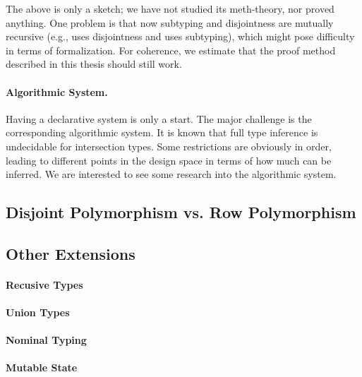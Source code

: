 The above is only a sketch; we have not studied its meth-theory, nor proved
anything. One problem is that now subtyping and disjointness are mutually
recursive (e.g.,  uses disjointness and  uses
subtyping), which might pose difficulty in terms of formalization. For
coherence, we estimate that the proof method described in this thesis should
still work.

\paragraph{Algorithmic System.}

Having a declarative system is only a start. The major challenge is the
corresponding algorithmic system. It is known that full type inference is
undecidable for intersection types. Some restrictions are obviously in order,
leading to different points in the design space in terms of how much can be
inferred. We are interested to see some research into the algorithmic system.


\subsection{Disjoint Polymorphism vs. Row Polymorphism}



\subsection{Other Extensions}

\paragraph{Recusive Types}


\paragraph{Union Types}

\paragraph{Nominal Typing}


\paragraph{Mutable State}



